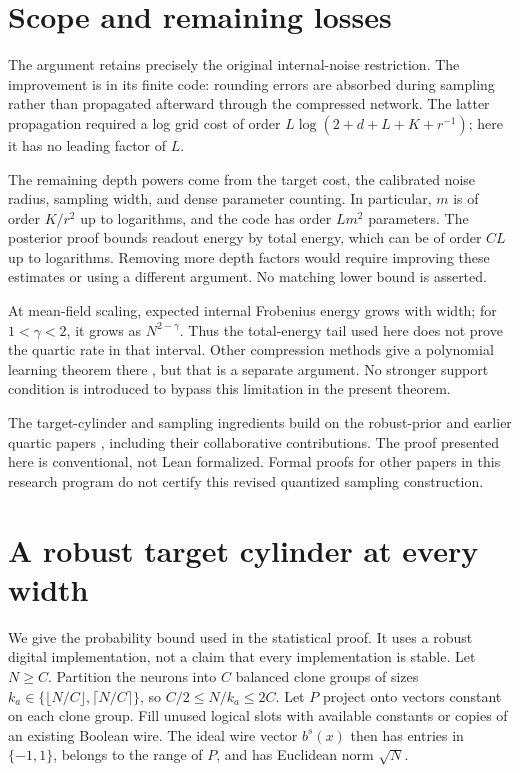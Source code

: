 \documentclass[11pt]{article}
\begin{document}
\section{Scope and remaining losses}

The argument retains precisely the original internal-noise restriction.
The improvement is in its finite code: rounding errors are absorbed during
sampling rather than propagated afterward through the compressed network.
The latter propagation required a log grid cost of order
$L\log(2+d+L+K+r^{-1})$; here it has no leading factor of $L$.

The remaining depth powers come from the target cost, the calibrated noise
radius, sampling width, and dense parameter counting. In particular,
$m$ is of order $K/r^2$ up to logarithms, and the code has order $Lm^2$
parameters. The posterior proof bounds readout energy by total energy,
which can be of order $CL$ up to logarithms. Removing more depth factors
would require improving these estimates or using a different argument.
No matching lower bound is asserted.

At mean-field scaling, expected internal Frobenius energy grows with width;
for $1<\gamma<2$, it grows as $N^{2-\gamma}$. Thus the total-energy tail
used here does not prove the quartic rate in that interval. Other
compression methods give a polynomial learning theorem there
\cite{all-scales}, but that is a separate argument. No stronger support
condition is introduced to bypass this limitation in the present theorem.

The target-cylinder and sampling ingredients build on the robust-prior
and earlier quartic papers \cite{robust-paper,quartic}, including their
collaborative contributions. The proof presented here is conventional,
not Lean formalized. Formal proofs for other papers in this research
program do not certify this revised quantized sampling construction.

\appendix
\section{A robust target cylinder at every width}
\label{app:cylinder}

We give the probability bound used in the statistical proof. It uses a
robust digital implementation, not a claim that every implementation is
stable. Let $N\ge C$. Partition the neurons into $C$ balanced clone groups
of sizes $k_a\in\{\lfloor N/C\rfloor,\lceil N/C\rceil\}$, so
$C/2\le N/k_a\le2C$. Let $P$ project onto vectors constant on each clone
group. Fill unused logical slots with available constants or copies of an
existing Boolean wire. The ideal wire
vector $b^s(x)$ then has entries in $\{-1,1\}$, belongs to the range of
$P$, and has Euclidean norm $\sqrt N$.
\end{document}
